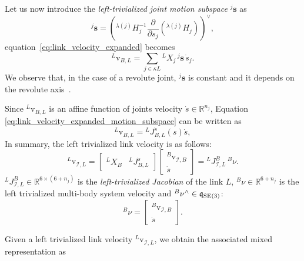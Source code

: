 Let us now introduce the \emph{left-trivialized joint motion subspace} ${}^{j}\textbf{s} $ as 
\begin{equation}
\label{eq:left-trivialized_joint_motion_subspace_def}
    {}^{j}\textbf{s} = \left({}^{\lambda(j)}H_{j}^{-1} \frac{\partial}{\partial s_j}\left({}^{\lambda(j)}H_{j}\right) \right) ^ \vee,
\end{equation}
equation~\eqref{eq:link_velocity_expanded} becomes
\begin{equation}
    \label{eq:link_velocity_expanded_motion_subspace}
    {}^L\mathrm{v}_{B, L} = \sum_{j \in \kappa{L}} {}^LX _{j}\,{}^{j}\textbf{s}\, \dot{s}_j.
\end{equation}
We observe that, in the case of a revolute joint, ${}^{j}\textbf{s}$ is constant and it depends on the revolute axis~\citep{traversaro2017}.
\par
Since ${}^L\mathrm{v}_{B, L}$ is an affine function of joints velocity $\dot{s} \in \mathbb{R}^{n_j}$, Equation \eqref{eq:link_velocity_expanded_motion_subspace} can be written as 
\begin{equation}
	{}^L\mathrm{v}_{B, L} = {}^L J _{B, L}^{\dot{s}}(s)  \dot{s},
\end{equation}
In summary, the left trivialized link velocity is as follows:
\begin{equation}
\label{eq:left-tivialized-link-velocity}
	{}^L\mathrm{v}_{\mathcal{I}, L} = \begin{bmatrix}
	{}^LX_B & {}^LJ_{B, L}^{\dot{s}}
	\end{bmatrix} \begin{bmatrix}
	{}^B\mathrm{v}_{\mathcal{I}, B} \\
	\dot{s}
	\end{bmatrix} = {}^LJ^B_{\mathcal{I}, L} \, {}^B {\nu}.
\end{equation}
${}^LJ^B_{\mathcal{I}, L} \in \mathbb{R}^{6\times (6+n_j)}$ is the \emph{left-trivialized Jacobian} of the link $L$, ${}^B \nu \in \mathbb{R}^{6+n_j}$ is the left trivialized multi-body system velocity and ${}^B \nu ^\wedge \in \mathfrak{q}_{{\mathrm{SE}}(3)}$:
\begin{equation}
    \label{eq:right_generalized_robot_velocity}
    {}^B\nu =  \begin{bmatrix}
	{}^B\mathrm{v}_{\mathcal{I}, B} \\
	\dot{s}
	\end{bmatrix}.
\end{equation}
\par
Given a left trivialized link velocity ${}^L\mathrm{v}_{\mathcal{I}, L}$, we obtain the associated mixed representation as

